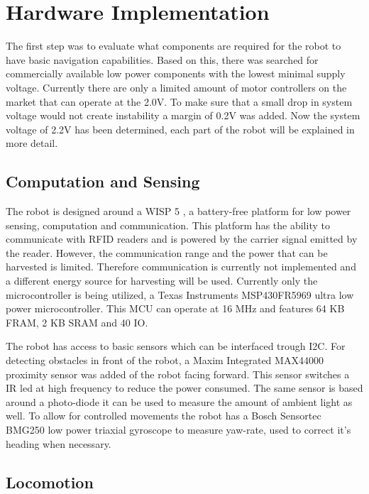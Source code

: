 	
\section{Hardware Implementation}


The first step was to evaluate what components are required for the robot to have basic navigation capabilities.
Based on this, there was searched for commercially available low power components with the lowest minimal supply voltage.
Currently there are only a limited amount of motor controllers on the market that can operate at the 2.0V.
To make sure that a small drop in system voltage would not create instability a margin of 0.2V was added.
Now the system voltage of 2.2V has been determined, each part of the robot will be explained in more detail. 

\subsection{Computation and Sensing}

The robot is designed around a WISP 5 \cite{wisp5_wiki_2017}, a battery-free platform for low power sensing, computation and communication.
This platform has the ability to communicate with RFID readers and is powered by the carrier signal emitted by the reader.
However, the communication range and the power that can be harvested is limited.
Therefore communication is currently not implemented and a different energy source for harvesting will be used.
Currently only the microcontroller is being utilized, a Texas Instruments MSP430FR5969 ultra low power microcontroller.
This MCU can operate at 16 MHz and features 64 KB FRAM, 2 KB SRAM and 40 IO.

The robot has access to basic sensors which can be interfaced trough I2C.
For detecting obstacles in front of the robot, a Maxim Integrated MAX44000 proximity sensor was added of the robot facing forward.
This sensor switches a IR led at high frequency to reduce the power consumed.
The same sensor is based around a photo-diode it can be used to measure the amount of ambient light as well.
To allow for controlled movements the robot has a Bosch Sensortec BMG250 low power triaxial gyroscope to measure yaw-rate, used to correct it's heading when necessary.

\subsection{Locomotion}

